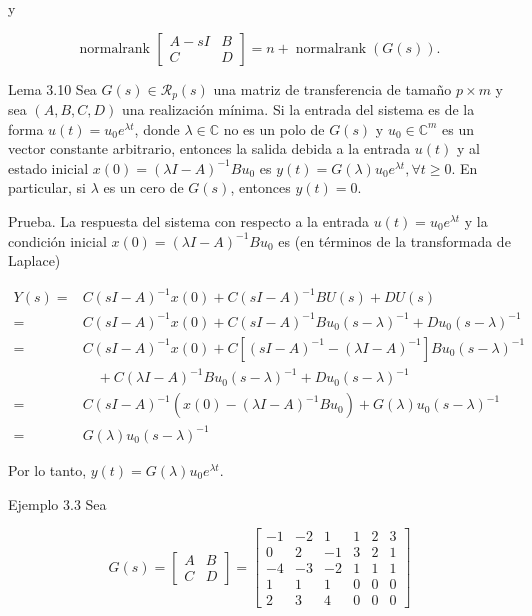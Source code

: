 y

$$
\text { normalrank }\left[\begin{array}{cc}
A-s I & B \\
C & D
\end{array}\right]=n+\operatorname{normalrank}(G(s)) \text {. }
$$

Lema 3.10 Sea $G(s) \in \mathcal{R}_{p}(s)$ una matriz de transferencia de tamaño $p \times m$ y sea $(A, B, C, D)$ una realización mínima. Si la entrada del sistema es de la forma $u(t)=u_{0} e^{\lambda t}$, donde $\lambda \in \mathbb{C}$ no es un polo de $G(s)$ y $u_{0} \in \mathbb{C}^{m}$ es un vector constante arbitrario, entonces la salida debida a la entrada $u(t)$ y al estado inicial $x(0)=(\lambda I-A)^{-1} B u_{0}$ es $y(t)=G(\lambda) u_{0} e^{\lambda t}, \forall t \geq 0$. En particular, si $\lambda$ es un cero de $G(s)$, entonces $y(t)=0$.

Prueba. La respuesta del sistema con respecto a la entrada $u(t)=u_{0} e^{\lambda t}$ y la condición inicial $x(0)=(\lambda I-A)^{-1} B u_{0}$ es (en términos de la transformada de Laplace)

$$
\begin{aligned}
Y(s)= & C(s I-A)^{-1} x(0)+C(s I-A)^{-1} B U(s)+D U(s) \\
= & C(s I-A)^{-1} x(0)+C(s I-A)^{-1} B u_{0}(s-\lambda)^{-1}+D u_{0}(s-\lambda)^{-1} \\
= & C(s I-A)^{-1} x(0)+C\left[(s I-A)^{-1}-(\lambda I-A)^{-1}\right] B u_{0}(s-\lambda)^{-1} \\
& \quad+C(\lambda I-A)^{-1} B u_{0}(s-\lambda)^{-1}+D u_{0}(s-\lambda)^{-1} \\
= & C(s I-A)^{-1}\left(x(0)-(\lambda I-A)^{-1} B u_{0}\right)+G(\lambda) u_{0}(s-\lambda)^{-1} \\
= & G(\lambda) u_{0}(s-\lambda)^{-1}
\end{aligned}
$$

Por lo tanto, $y(t)=G(\lambda) u_{0} e^{\lambda t}$.

Ejemplo 3.3 Sea

$$
G(s)=\left[\begin{array}{c|c}
A & B \\
\hline C & D
\end{array}\right]=\left[\begin{array}{ccc|ccc}
-1 & -2 & 1 & 1 & 2 & 3 \\
0 & 2 & -1 & 3 & 2 & 1 \\
-4 & -3 & -2 & 1 & 1 & 1 \\
\hline 1 & 1 & 1 & 0 & 0 & 0 \\
2 & 3 & 4 & 0 & 0 & 0
\end{array}\right]
$$

